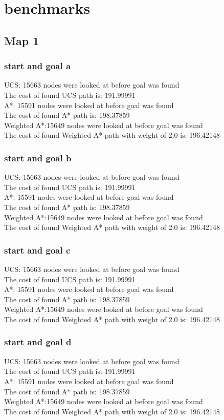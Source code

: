 \documentclass[11pt]{article} %
\begin{document}
\section{benchmarks}
\subsection{Map 1}
\subsubsection{start and goal a}
UCS: 15663 nodes were looked at before goal was found\\
The cost of found UCS path is: 191.99991\\
A*: 15591 nodes were looked at before goal was found\\
The cost of found A* path is: 198.37859\\
Weighted A*:15649 nodes were looked at before goal was found\\
The cost of found Weighted A* path with weight of 2.0 is: 196.42148
\subsubsection{start and goal b}
UCS: 15663 nodes were looked at before goal was found\\
The cost of found UCS path is: 191.99991\\
A*: 15591 nodes were looked at before goal was found\\
The cost of found A* path is: 198.37859\\
Weighted A*:15649 nodes were looked at before goal was found\\
The cost of found Weighted A* path with weight of 2.0 is: 196.42148
\subsubsection{start and goal c}
UCS: 15663 nodes were looked at before goal was found\\
The cost of found UCS path is: 191.99991\\
A*: 15591 nodes were looked at before goal was found\\
The cost of found A* path is: 198.37859\\
Weighted A*:15649 nodes were looked at before goal was found\\
The cost of found Weighted A* path with weight of 2.0 is: 196.42148
\subsubsection{start and goal d}
UCS: 15663 nodes were looked at before goal was found\\
The cost of found UCS path is: 191.99991\\
A*: 15591 nodes were looked at before goal was found\\
The cost of found A* path is: 198.37859\\
Weighted A*:15649 nodes were looked at before goal was found\\
The cost of found Weighted A* path with weight of 2.0 is: 196.42148
\end{document}
